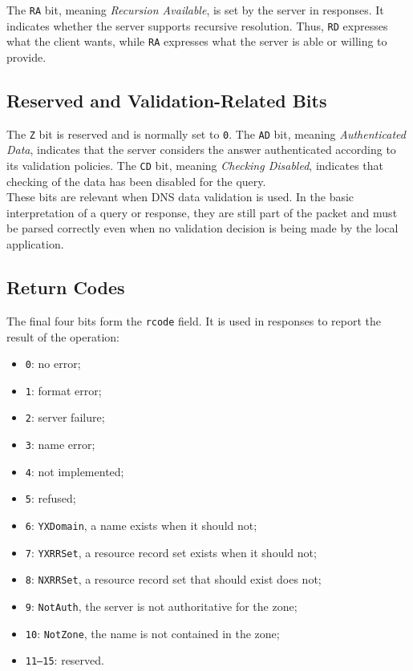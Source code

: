 \documentclass{scrbook}
\begin{document}
	The \texttt{RA} bit, meaning \emph{Recursion Available}, is set by the server in responses. It indicates whether the server supports recursive resolution. Thus, \texttt{RD} expresses what the client wants, while \texttt{RA} expresses what the server is able or willing to provide.
	
	\subsection{Reserved and Validation-Related Bits}
	
	The \texttt{Z} bit is reserved and is normally set to \texttt{0}. The \texttt{AD} bit, meaning \emph{Authenticated Data}, indicates that the server considers the answer authenticated according to its validation policies. The \texttt{CD} bit, meaning \emph{Checking Disabled}, indicates that checking of the data has been disabled for the query.\\
	
	These bits are relevant when DNS data validation is used. In the basic interpretation of a query or response, they are still part of the packet and must be parsed correctly even when no validation decision is being made by the local application.
	
	\subsection{Return Codes}
	
	The final four bits form the \texttt{rcode} field. It is used in responses to report the result of the operation:
	\begin{itemize}
	    \item \texttt{0}: no error;
	    \item \texttt{1}: format error;
	    \item \texttt{2}: server failure;
	    \item \texttt{3}: name error;
	    \item \texttt{4}: not implemented;
	    \item \texttt{5}: refused;
	    \item \texttt{6}: \texttt{YXDomain}, a name exists when it should not;
	    \item \texttt{7}: \texttt{YXRRSet}, a resource record set exists when it should not;
	    \item \texttt{8}: \texttt{NXRRSet}, a resource record set that should exist does not;
	    \item \texttt{9}: \texttt{NotAuth}, the server is not authoritative for the zone;
	    \item \texttt{10}: \texttt{NotZone}, the name is not contained in the zone;
	    \item \texttt{11--15}: reserved.
	\end{itemize}
	
\end{document}
